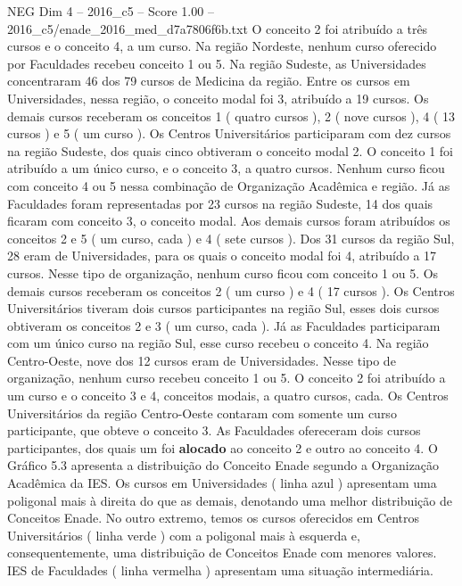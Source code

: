 \begin{textsample}{NEG Dim 4 – 2016\_c5 – Score 1.00 – 2016\_c5/enade\_2016\_med\_d7a7806f6b.txt}
O conceito 2 foi atribuído a três cursos e o conceito 4, a um curso.
Na região Nordeste, nenhum curso oferecido por Faculdades recebeu conceito 1 ou 5.
Na região Sudeste, as Universidades concentraram 46 dos 79 cursos de Medicina da região.
Entre os cursos em Universidades, nessa região, o conceito modal foi 3, atribuído a 19 cursos.
Os demais cursos receberam os conceitos 1 ( quatro cursos ), 2 ( nove cursos ), 4 ( 13 cursos ) e 5 ( um curso ).
Os Centros Universitários participaram com dez cursos na região Sudeste, dos quais cinco obtiveram o conceito modal 2.
O conceito 1 foi atribuído a um único curso, e o conceito 3, a quatro cursos.
Nenhum curso ficou com conceito 4 ou 5 nessa combinação de Organização Acadêmica e região.
Já as Faculdades foram representadas por 23 cursos na região Sudeste, 14 dos quais ficaram com conceito 3, o conceito modal.
Aos demais cursos foram atribuídos os conceitos 2 e 5 ( um curso, cada ) e 4 ( sete cursos ).
Dos 31 cursos da região Sul, 28 eram de Universidades, para os quais o conceito modal foi 4, atribuído a 17 cursos.
Nesse tipo de organização, nenhum curso ficou com conceito 1 ou 5.
Os demais cursos receberam os conceitos 2 ( um curso ) e 4 ( 17 cursos ).
Os Centros Universitários tiveram dois cursos participantes na região Sul, esses dois cursos obtiveram os conceitos 2 e 3 ( um curso, cada ).
Já as Faculdades participaram com um único curso na região Sul, esse curso recebeu o conceito 4.
Na região Centro-Oeste, nove dos 12 cursos eram de Universidades.
Nesse tipo de organização, nenhum curso recebeu conceito 1 ou 5.
O conceito 2 foi atribuído a um curso e o conceito 3 e 4, conceitos modais, a quatro cursos, cada.
Os Centros Universitários da região Centro-Oeste contaram com somente um curso participante, que obteve o conceito 3.
As Faculdades ofereceram dois cursos participantes, dos quais um foi \textbf{alocado} ao conceito 2 e outro ao conceito 4.
O Gráfico 5.3 apresenta a distribuição do Conceito Enade segundo a Organização Acadêmica da IES.
Os cursos em Universidades ( linha azul ) apresentam uma poligonal mais à direita do que as demais, denotando uma melhor distribuição de Conceitos Enade.
No outro extremo, temos os cursos oferecidos em Centros Universitários ( linha verde ) com a poligonal mais à esquerda e, consequentemente, uma distribuição de Conceitos Enade com menores valores.
IES de Faculdades ( linha vermelha ) apresentam uma situação intermediária.

\end{textsample}

